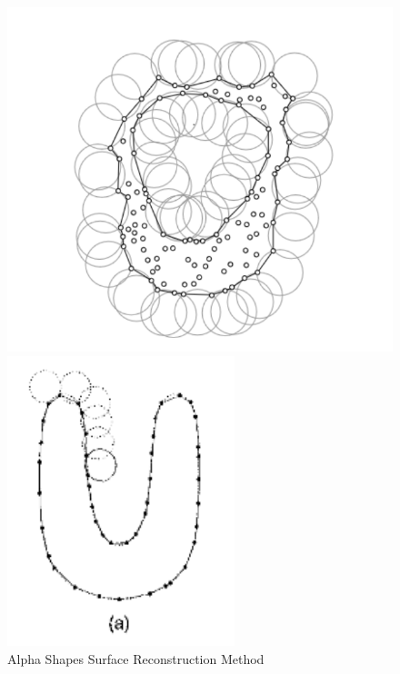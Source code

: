 \begin{figure}[htbp]
    \centering
    \begin{minipage}[b]{0.45\textwidth}
    \centering
    \includegraphics[width=1\linewidth]{97_graphics/related_work/alpha_shapes.pdf}
    \caption{Alpha Shapes Surface Reconstruction Method \parencite{alpha_shapes_stanford} }
    \label{fig:related_work-alpha_shapes}
    \end{minipage}
    \hfill
    \begin{minipage}[b]{0.45\textwidth}
    \centering
    \includegraphics[width=1\linewidth]{97_graphics/related_work/ball_pivoting.pdf}

\end{minipage}
\end{figure}
